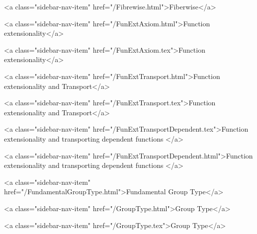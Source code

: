       
    
      
        
          <a class="sidebar-nav-item" href="/Fibrewise.html">Fiberwise</a>
        
      
    
      
        
          <a class="sidebar-nav-item" href="/FunExtAxiom.html">Function extensionality</a>
        
      
    
      
        
          <a class="sidebar-nav-item" href="/FunExtAxiom.tex">Function extensionality</a>
        
      
    
      
        
          <a class="sidebar-nav-item" href="/FunExtTransport.html">Function extensionality and Transport</a>
        
      
    
      
        
          <a class="sidebar-nav-item" href="/FunExtTransport.tex">Function extensionality and Transport</a>
        
      
    
      
        
          <a class="sidebar-nav-item" href="/FunExtTransportDependent.tex">Function extensionality and transporting dependent functions </a>
        
      
    
      
        
          <a class="sidebar-nav-item" href="/FunExtTransportDependent.html">Function extensionality and transporting dependent functions </a>
        
      
    
      
        
          <a class="sidebar-nav-item" href="/FundamentalGroupType.html">Fundamental Group Type</a>
        
      
    
      
        
          <a class="sidebar-nav-item" href="/GroupType.html">Group Type</a>
        
      
    
      
        
          <a class="sidebar-nav-item" href="/GroupType.tex">Group Type</a>
        
      
    
